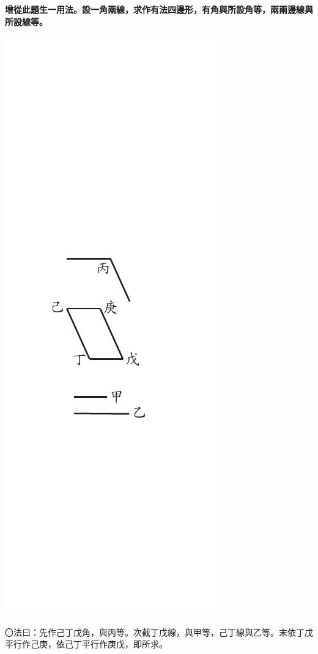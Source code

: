 \documentclass[12pt,b5paper,landscape]{article}
\newcommand{\bcom}[1]{〇#1}
\newcommand{\cthm}[1]{{
\vspace{8pt}

\bfseries #1}}
\begin{document}
\begin{multicols}{2}
\cthm{增從此題生一用法。設一角兩線，求作有法四邊形，有角與所設角等，兩兩邊線與所設線等。}
\begin{center}
      \includegraphics[angle=90]{eu78}
\end{center}
\bcom{法曰：先作己丁戊角，與丙等。次截丁戊線，與甲等，己丁線與乙等。末依丁戊平行作己庚，依己丁平行作庚戊，即所求。}
\begin{center}

\end{center}
\end{multicols}
\end{document}
